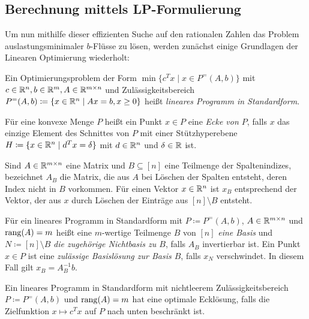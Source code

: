 

\subsection{Berechnung mittels LP-Formulierung}

Um nun mithilfe dieser effizienten Suche auf den rationalen Zahlen das Problem auslastungsminimaler $b$-Flüsse zu lösen, werden zunächst einige Grundlagen der Linearen Optimierung wiederholt:
\begin{definition}
	Ein Optimierungsproblem der Form $\min\{ c^T x \mid x \in P^=(A, b) \}$ mit $c\in\mathbb{R}^n, b\in\mathbb{R}^m, A\in\mathbb{R}^{m\times n}$ und Zulässigkeitsbereich $P^=(A,b)\coloneq \{ x\in\mathbb{R}^n \mid Ax = b, x\geq 0 \}$ heißt \emph{lineares Programm in Standardform}.
\end{definition}

\begin{definition}
	Für eine konvexe Menge $P$ heißt ein Punkt $x\in P$ eine \emph{Ecke von $P$}, falls $x$ das einzige Element des Schnittes von $P$ mit einer Stützhyperebene $H\coloneq \{ x\in\mathbb{R}^n \mid d^T x = \delta \}$ mit $d\in\mathbb{R}^n$ und $\delta\in\mathbb{R}$ ist.
\end{definition}

\begin{notation}
Sind $A\in\mathbb{R}^{m\times n}$ eine Matrix und $B\subseteq[n]$ eine Teilmenge der Spaltenindizes, bezeichnet $A_B$ die Matrix, die aus $A$ bei Löschen der Spalten entsteht, deren Index nicht in $B$ vorkommen.
Für einen Vektor $x\in\mathbb{R}^n$ ist $x_B$ entsprechend der Vektor, der aus $x$ durch Löschen der Einträge aus $[n]\setminus B$ entsteht.
\end{notation}

\begin{definition}
Für ein lineares Programm in Standardform mit $P\coloneq P^=(A, b)$, $A\in\mathbb{R}^{m\times n}$ und $\operatorname{rang}(A) = m$ heißt eine $m$-wertige Teilmenge $B$ von $[n]$ \emph{eine Basis} und $N\coloneq [n]\setminus B$ \emph{die zugehörige Nichtbasis zu $B$}, falls $A_B$ invertierbar ist.
Ein Punkt $x\in P$ ist eine \emph{zulässige Basislösung zur Basis $B$}, falls $x_N$ verschwindet.
In diesem Fall gilt $x_B = A_B^{-1} b$.
\end{definition}

\begin{satz}\label{satz-existence-optimality-for-lps}
	Ein lineares Programm in Standardform mit nichtleerem Zulässigkeitsbereich $P\coloneq P^=(A,b)$ und $\operatorname{rang}(A) = m$ hat eine optimale Ecklösung, falls die Zielfunktion $x\mapsto c^T x$ auf $P$ nach unten beschränkt ist.
\end{satz}


